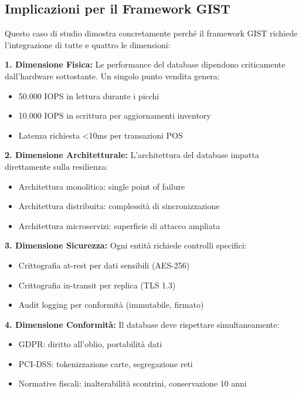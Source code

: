 \subsection{Implicazioni per il Framework GIST}
\label{subsec:implicazioni_gist}

Questo caso di studio dimostra concretamente perché il framework GIST richiede l'integrazione di tutte e quattro le dimensioni:

\textbf{1. Dimensione Fisica:} Le performance del database dipendono criticamente dall'hardware sottostante. Un singolo punto vendita genera:
\begin{itemize}
\item 50.000 IOPS in lettura durante i picchi
\item 10.000 IOPS in scrittura per aggiornamenti inventory
\item Latenza richiesta <10ms per transazioni POS
\end{itemize}

\textbf{2. Dimensione Architetturale:} L'architettura del database impatta direttamente sulla resilienza:
\begin{itemize}
\item Architettura monolitica: single point of failure
\item Architettura distribuita: complessità di sincronizzazione
\item Architettura microservizi: superficie di attacco ampliata
\end{itemize}

\textbf{3. Dimensione Sicurezza:} Ogni entità richiede controlli specifici:
\begin{itemize}
\item Crittografia at-rest per dati sensibili (AES-256)
\item Crittografia in-transit per replica (TLS 1.3)
\item Audit logging per conformità (immutabile, firmato)
\end{itemize}

\textbf{4. Dimensione Conformità:} Il database deve rispettare simultaneamente:
\begin{itemize}
\item GDPR: diritto all'oblio, portabilità dati
\item PCI-DSS: tokenizzazione carte, segregazione reti
\item Normative fiscali: inalterabilità scontrini, conservazione 10 anni
\end{itemize}

